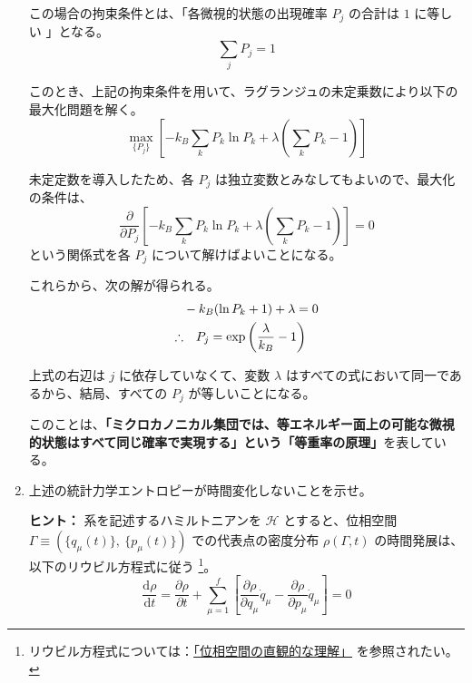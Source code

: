 \documentclass[uplatex,dvipdfmx,a4paper,11pt]{jsarticle}
\newcommand{\diff}{\mathrm d}
\newcommand{\difd}[2]{\dfrac{\diff #1}{\diff #2}}
\newcommand{\difp}[2]{\dfrac{\partial #1}{\partial #2}}
\begin{document}
\begin{enumerate}
この場合の拘束条件とは、「各微視的状態の出現確率 $P_j$ の合計は $1$ に等しい 」となる。
\begin{equation*}
\sum_j P_j = 1
\end{equation*}

このとき、上記の拘束条件を用いて、ラグランジュの未定乗数により以下の最大化問題を解く。
\begin{equation*}
\max_{\{ P_j \}} \left[ -k_B \sum_k P_k \ln P_k + \lambda \left( \sum_k P_k - 1 \right) \right]
\end{equation*}

未定定数を導入したため、各 $P_j$ は独立変数とみなしてもよいので、最大化の条件は、
\begin{equation*}
\frac{\partial}{\partial P_j} \left[ -k_B \sum_k P_k \ln P_k + \lambda \left( \sum_k P_k - 1 \right) \right] = 0
\end{equation*}
という関係式を各 $P_j$ について解けばよいことになる。

これらから、次の解が得られる。
\begin{align*}
&-k_B (\ln P_k + 1) + \lambda = 0 \notag \\
\therefore &\quad P_j = \exp \left(\frac{\lambda}{k_B} -1 \right)
\end{align*}

上式の右辺は $j$ に依存していなくて、変数 $\lambda$ はすべての式において同一であるから、結局、すべての $P_j$ が等しいことになる。

このことは、{\bf 「ミクロカノニカル集団では、等エネルギー面上の可能な微視的状態はすべて同じ確率で実現する」という「等重率の原理」}を表している。

\newpage

\item
上述の統計力学エントロピーが時間変化しないことを示せ。


\begin{itembox}[l]{{\bf ヒント：}}
系を記述するハミルトニアンを $\mathcal{H}$ とすると、位相空間 $\Gamma \equiv ( \{ q_{\mu}(t) \},~ \{ p_{\mu}(t) \} )$ での代表点の密度分布 $\rho(\Gamma,t)$ の時間発展は、以下のリウビル方程式に従う
\footnote
{
リウビル方程式については：\href{http://kisokouza.island.ac/documents/Stat_Phys_Entropy.pdf}{「位相空間の直観的な理解」} を参照されたい。
}。
\begin{equation*}
\difd{\rho}{t} 
=
\difp{\rho}{t} 
+ \sum_{\mu = 1}^{f} 
	\left[
		\difp{\rho}{q_{\mu}}\dot{q}_{\mu}
		- \difp{\rho}{p_{\mu}}\dot{q}_{\mu}
	\right]
= 0
\end{equation*}


\end{itembox}
\end{enumerate}
\end{document}
